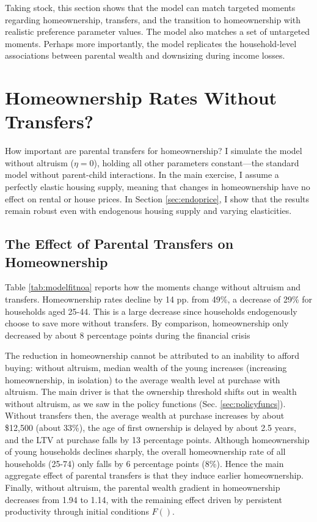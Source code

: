 \documentclass[12pt]{article}
\begin{document}
Taking stock, this section shows that the model can match targeted moments regarding homeownership, transfers, and the transition to homeownership with realistic preference parameter values. The model also matches a set of untargeted moments. Perhaps more importantly, the model replicates the household-level associations between parental wealth and downsizing during income losses. 



\section{Homeownership Rates Without Transfers?}\label{sec:quant}
How important are parental transfers for homeownership? I simulate the model without altruism ($\eta=0$), holding all other parameters constant---the standard model without parent-child interactions. In the main exercise, I assume a perfectly elastic housing supply, meaning that changes in homeownership have no effect on rental or house prices. In Section \ref{sec:endoprice}, I show that the results remain robust even with endogenous housing supply and varying elasticities.

\subsection{The Effect of Parental Transfers on Homeownership}
Table \ref{tab:modelfitnoa} reports how the moments change without altruism and transfers. Homeownership rates decline by 14 pp. from 49\%, a decrease of 29\% for households aged 25-44. This is a large decrease since households endogenously choose to save more without transfers. By comparison, homeownership only decreased by about 8 percentage points during the financial crisis

The reduction in homeownership cannot be attributed to an inability to afford buying: without altruism, median wealth of the young increases (increasing homeownership, in isolation) to the average wealth level at purchase with altruism. The main driver is that the ownership threshold shifts out in wealth without altruism, as we saw in the policy functions (Sec. \ref{sec:policyfuncs}). Without transfers then, the average wealth at purchase increases by about \$12,500 (about 33\%), the age of first ownership is delayed by about 2.5 years, and the LTV at purchase falls by 13 percentage points. Although homeownership of young households declines sharply, the overall homeownership rate of all households (25-74) only falls by 6 percentage points (8\%). Hence the main aggregate effect of parental transfers is that they induce earlier homeownership. Finally, without altruism, the parental wealth gradient in homeownership decreases from 1.94 to 1.14, with the remaining effect driven by persistent productivity through initial conditions $F()$.
\end{document}
